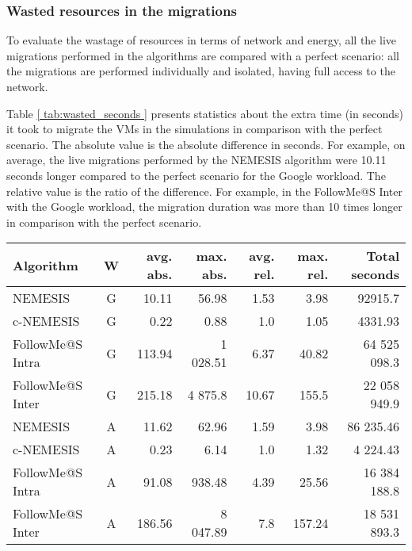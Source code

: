\subsubsection{Wasted resources in the migrations}

To evaluate the wastage of resources in terms of network and energy, all the live migrations performed in the algorithms are compared with a perfect scenario: all the migrations are performed individually and isolated, having full access to the network.

Table \ref{ tab:wasted_seconds } presents statistics about the extra time (in seconds) it took to migrate the VMs in the simulations in comparison with the perfect scenario. The absolute value is the absolute difference in seconds. For example, on average, the live migrations performed by the NEMESIS algorithm were 10.11 seconds longer compared to the perfect scenario for the Google workload. The relative value is the ratio of the difference. For example, in the FollowMe@S Inter with the Google workload, the migration duration was more than 10 times longer in comparison with the perfect scenario.


\begin{table*}[!ht]

\caption{Extra seconds during migrations compared to the case when there is no congestion, where ``W'' stands for ``Workload'', ``G'' for Google and, ``A'' for Azure. ``avg.'' for the average of the observations, ``max.'' for the maximum value, ``abs.'' for the absolute value, and ``rel.'' for the relative value.} \label{ tab:wasted_seconds } \centering
\begin{tabular}{|l|c|r|r|r|r|r|}
  \hline  
  \textbf{Algorithm} & \textbf{W}  & \textbf{avg. abs.} &  \textbf{max. abs.} & \textbf{avg. rel.} &  \textbf{max. rel.} &  \textbf{Total seconds} \\
  
  \hline
  NEMESIS  & G & 10.11  & 56.98 & 1.53 & 3.98  & 92915.7 \\
  \hline
  c-NEMESIS & G & 0.22  & 0.88 & 1.0 & 1.05  & 4331.93 \\
  \hline
  FollowMe@S Intra & G & 113.94  & 1 028.51 &  6.37  & 40.82  & 64 525 098.3 \\
  \hline
  FollowMe@S Inter & G & 215.18  & 4 875.8 & 10.67 & 155.5  & 22 058 949.9\\
  \hline
  NEMESIS  & A & 11.62  & 62.96 & 1.59 & 3.98  & 86 235.46 \\
  \hline
  c-NEMESIS & A &  0.23 & 6.14   & 1.0 & 1.32  & 4 224.43\\
  \hline
  FollowMe@S Intra & A & 91.08  & 938.48 & 4.39 & 25.56  & 16 384 188.8  \\
  \hline
  FollowMe@S Inter & A & 186.56  & 8 047.89 & 7.8 & 157.24  & 18 531 893.3 \\
  \hline

\end{tabular}

\end{table*}

